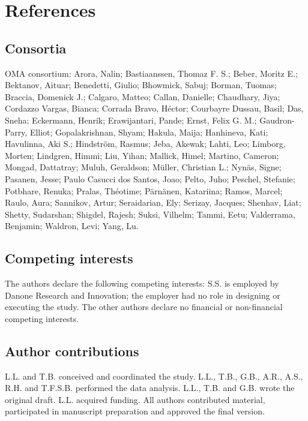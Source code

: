 \documentclass[
  sn-nature,
]{sn-jnl}
\newcounter{none} %
\begin{document}
\section{References}\label{references}

\renewcommand{\bibsection}{}


\subsection{Consortia}\label{sec-consortium}

OMA consortium: Arora, Nalin; Bastiaanssen, Thomaz F. S.; Beber, Moritz
E.; Bektanov, Aituar; Benedetti, Giulio; Bhowmick, Sabuj; Borman,
Tuomas; Braccia, Domenick J.; Calgaro, Matteo; Callan, Danielle;
Chaudhary, Jiya; Cordazzo Vargas, Bianca; Corrada Bravo, Héctor;
Courbayre Dussau, Basil; Das, Sneha; Eckermann, Henrik; Erawijantari,
Pande; Ernst, Felix G. M.; Gaudron-Parry, Elliot; Gopalakrishnan, Shyam;
Hakula, Maija; Hanhineva, Kati; Havulinna, Aki S.; Hindström, Rasmus;
Jeba, Akewak; Lahti, Leo; Limborg, Morten; Lindgren, Himmi; Liu, Yihan;
Mallick, Himel; Martino, Cameron; Mongad, Dattatray; Muluh, Geraldson;
Müller, Christian L.; Nynäs, Signe; Pasanen, Jesse; Paulo Casucci dos
Santos, Joao; Pelto, Juho; Peschel, Stefanie; Potbhare, Renuka; Pralas,
Théotime; Pärnänen, Katariina; Ramos, Marcel; Raulo, Aura; Sannikov,
Artur; Seraidarian, Ely; Serizay, Jacques; Shenhav, Liat; Shetty,
Sudarshan; Shigdel, Rajesh; Suksi, Vilhelm; Tammi, Eetu; Valderrama,
Benjamin; Waldron, Levi; Yang, Lu.

\subsection{Competing interests}\label{sec-interests}

The authors declare the following competing interests: S.S. is employed
by Danone Research and Innovation; the employer had no role in designing
or executing the study. The other authors declare no financial or
non-financial competing interests.

\subsection{Author contributions}\label{sec-contributions}

L.L. and T.B. conceived and coordinated the study. L.L., T.B., G.B.,
A.R., A.S., R.H. and T.F.S.B. performed the data analysis. L.L., T.B.
and G.B. wrote the original draft. L.L. acquired funding. All authors
contributed material, participated in manuscript preparation and
approved the final version.
\end{document}
